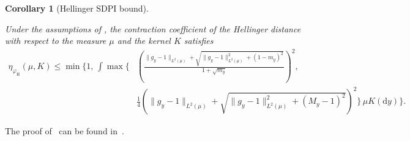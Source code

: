 \documentclass[11pt]{article}
\theoremstyle{plain}
\newtheorem{corollary}{Corollary}[section]
\theoremstyle{remark}
\begin{document}
\begin{corollary}[Hellinger SDPI bound]
\label{cor:hellingerSDPI}

Under the assumptions of
, the contraction coefficient of the Hellinger distance with respect to the measure $\mu$ and the kernel $K$ satisfies
\begin{align}
\eta_{\varphi_{\mathrm H}}(\mu,K)
\leq
\min\Bigg\{
1,\,
\int
\max\Bigg\{
&
\left(
\frac{
\lVert g_y-1\rVert_{L^2(\mu)}
+
\sqrt{
\lVert g_y-1\rVert_{L^2(\mu)}^2
+
(1-m_y)^2
}
}{
1+\sqrt{m_y}
}
\right)^2,
\nonumber\\
&
\frac{1}{4}
\left(
\lVert g_y-1\rVert_{L^2(\mu)}
+
\sqrt{
\lVert g_y-1\rVert_{L^2(\mu)}^2
+
(M_y-1)^2
}
\right)^2
\Bigg\}
\,\mu K(\mathrm dy)
\Bigg\}.
\label{eq:hellingerSDPIClosedFormBound}
\end{align}
\end{corollary}

The proof of~ can be found in~.
\end{document}
